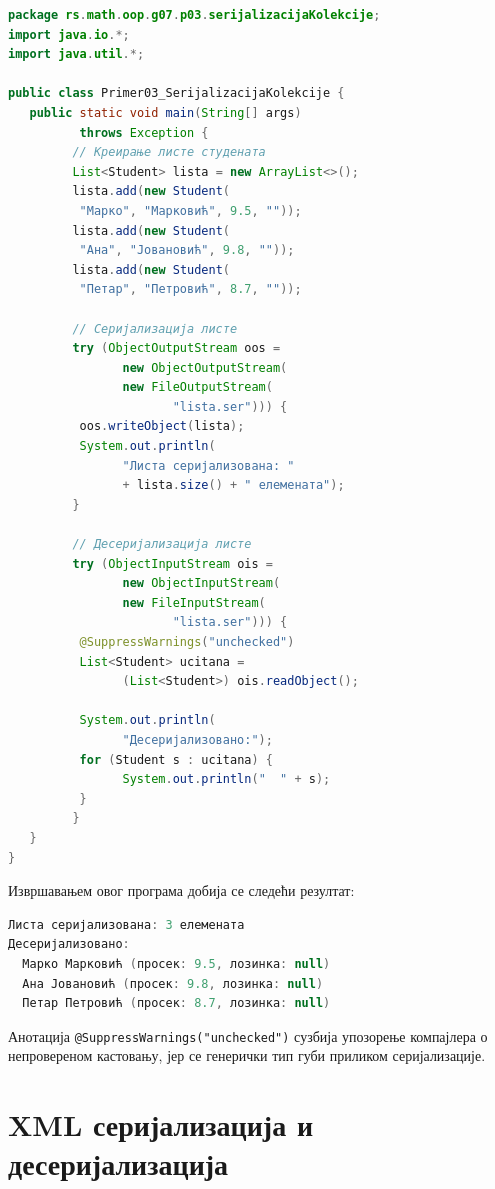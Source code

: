 \begin{lstlisting}[language=Java]
package rs.math.oop.g07.p03.serijalizacijaKolekcije;
import java.io.*;
import java.util.*;
 
public class Primer03_SerijalizacijaKolekcije {
   public static void main(String[] args)
          throws Exception {
         // Креирање листе студената
         List<Student> lista = new ArrayList<>();
         lista.add(new Student(
          "Марко", "Марковић", 9.5, ""));
         lista.add(new Student(
          "Ана", "Јовановић", 9.8, ""));
         lista.add(new Student(
          "Петар", "Петровић", 8.7, ""));
 
         // Серијализација листе
         try (ObjectOutputStream oos =
                new ObjectOutputStream(
                new FileOutputStream(
                       "lista.ser"))) {
          oos.writeObject(lista);
          System.out.println(
                "Листа серијализована: "
                + lista.size() + " елемената");
         }
 
         // Десеријализација листе
         try (ObjectInputStream ois =
                new ObjectInputStream(
                new FileInputStream(
                       "lista.ser"))) {
          @SuppressWarnings("unchecked")
          List<Student> ucitana =
                (List<Student>) ois.readObject();
 
          System.out.println(
                "Десеријализовано:");
          for (Student s : ucitana) {
                System.out.println("  " + s);
          }
         }
   }
}
\end{lstlisting}


Извршавањем овог програма добија се следећи резултат:


\begin{lstlisting}[language=Java]
Листа серијализована: 3 елемената
Десеријализовано:
  Марко Марковић (просек: 9.5, лозинка: null)
  Ана Јовановић (просек: 9.8, лозинка: null)
  Петар Петровић (просек: 8.7, лозинка: null)
\end{lstlisting}


Анотација \texttt{@SuppressWarnings("unchecked")} сузбија упозорење компајлера о непровереном кастовању, јер се генерички тип губи приликом серијализације.


\section{XML серијализација и десеријализација}

